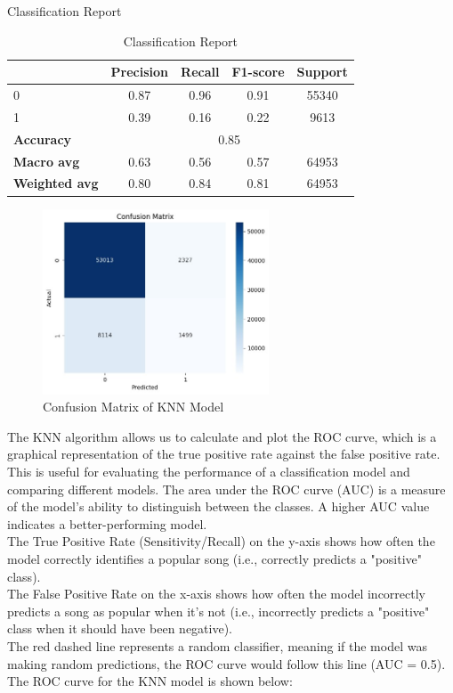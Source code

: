 Classification Report
\begin{table}[h]
    \centering
    \begin{tabular}{lcccc}
        \toprule
        & \textbf{Precision} & \textbf{Recall} & \textbf{F1-score} & \textbf{Support} \\
        \midrule
        0 & 0.87 & 0.96 & 0.91 & 55340 \\
        1 & 0.39 & 0.16 & 0.22 & 9613 \\
        \midrule
        \textbf{Accuracy} & \multicolumn{4}{c}{0.85} \\
        \textbf{Macro avg} & 0.63 & 0.56 & 0.57 & 64953 \\
        \textbf{Weighted avg} & 0.80 & 0.84 & 0.81 & 64953 \\
        \bottomrule
    \end{tabular}
    \caption{Classification Report}
    \label{tab:classification_report}
\end{table}

\begin{figure}[h] 
    \centering 
    \includegraphics[width=0.6\textwidth]{media/knn-confusion_matrix.jpg}
    \caption{Confusion Matrix of KNN Model}

\end{figure}

\newpage

The KNN algorithm allows us to calculate and plot the ROC curve, which is a graphical representation of the true positive rate against the false positive rate. This is useful for evaluating the performance of a classification model and comparing different models. The area under the ROC curve (AUC) is a measure of the model's ability to distinguish between the classes. A higher AUC value indicates a better-performing model.\\
The True Positive Rate (Sensitivity/Recall) on the y-axis shows how often the model correctly identifies a popular song (i.e., correctly predicts a "positive" class).\\
The False Positive Rate on the x-axis shows how often the model incorrectly predicts a song as popular when it's not (i.e., incorrectly predicts a "positive" class when it should have been negative).\\
The red dashed line represents a random classifier, meaning if the model was making random predictions, the ROC curve would follow this line (AUC = 0.5).\\
The ROC curve for the KNN model is shown below:


